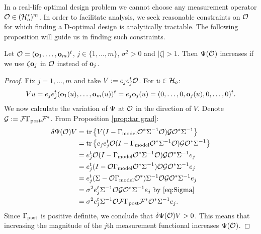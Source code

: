 In a real-life optimal design problem we cannot choose any measurement
operator $\mathcal{O} \in (\mathcal{H}_o^*)^m$. In order to facilitate analysis, we
seek reasonable constraints on $\mathcal{O}$ for which finding a D-optimal
design is analytically tractable. The following proposition will guide
us in finding such constraints.

\begin{proposition}\label{prop:bigger better}
  Let $\mathcal{O} = (\mathbf{o}_1,\dots,\mathbf{o}_m)^t$, $j \in \{1,\dots,m\}$,
  $\sigma^2 > 0$ and $|\zeta| > 1$. Then $\Psi(\mathcal{O})$ increases if we
  use $\zeta \mathbf{o}_j$ in $\mathcal{O}$ instead of $\mathbf{o}_j$.
\end{proposition}

\begin{proof} 
  Fix $j=1,\dots,m$ and take $V:= e_j e_j^t \mathcal{O}$. For $u
  \in \mathcal{H}_o$:
  \begin{equation*}
    Vu = e_je_j^t (\meas_1(u),\dots,\meas_m(u) )^t = e_j \meas_j(u)
    = (0,\dots,0,\meas_j(u),0,\dots,0)^t.
  \end{equation*}
  We now calculate the variation of $\Psi$ at $\mathcal{O}$ in the direction
  of $V$. Denote $\mathcal{G}: = \mathcal{F} \Gamma_{\textup{post}} \mathcal{F}^*$. From Proposition
  \ref{prop:tar grad}:
  \begin{align*}
     \delta \tar(\obs) V 
    &= \tr{V ( I - \modcov \obs^*\Sigma^{-1}\obs) \tmp \obs^* \Sigma^{-1}} \\
    &= \tr{e_je_j^t \obs ( I - \modcov \obs^*\Sigma^{-1}\obs) \tmp \obs^* \Sigma^{-1}} \\
    &= e_j^t \obs ( I - \modcov \obs^*\Sigma^{-1}\obs) \tmp \obs^* \Sigma^{-1}e_j \\
    &= e_j^t ( I - \obs \modcov \obs^*\Sigma^{-1})\obs \tmp \obs^* \Sigma^{-1}e_j \\  
    &=  e_j^t(\Sigma-\obs \modcov \obs^*) \Sigma^{-1}\obs \tmp \obs^* \Sigma^{-1}e_j \\
    &=\sigma^2 e_j^t \Sigma^{-1}\obs \tmp \obs^* \Sigma^{-1}e_j
    \text{ by \eqref{eq:Sigma} }\\
    &=\sigma^2 e_j^t \Sigma^{-1}\obs \fwd \postcov \fwd^* \obs^* \Sigma^{-1}e_j.
  \end{align*} 
  Since $\Gamma_{\textup{post}}$ is positive definite, we conclude that $\delta
  \Psi(\mathcal{O}) V > 0$. This means that increasing the magnitude of the
  $j$th measurement functional increases $\Psi(\mathcal{O})$.
\end{proof}

